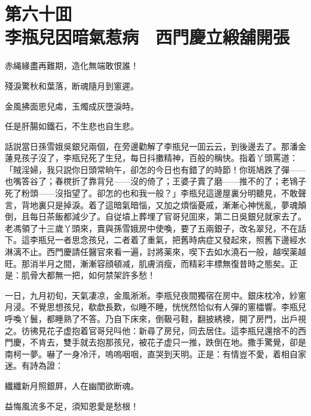 
\chapter*{第六十囬　\\李瓶兒因暗氣惹病　西門慶立緞舖開張}


\begin{myquote}
赤䋲緣盡再難期，造化無端敢恨誰！

殘淚驚秋和葉落，断魂隨月到窻遲。

金風拂面思兒䖏，玉燭成灰墮淚時。

任是肝腸如鐵石，不生悲也自生悲。
\end{myquote}

話説當日孫雪娥吳銀兒兩個，在旁邊勸解了李瓶兒一囬云云，到後邊去了。那潘金蓮見孩子沒了，李瓶兒死了生兒，每日抖擻精神，百般的稱快。指着丫頭罵道：「賊淫婦，我只説你日頭常晌午，卻怎的今日也有錯了的時節！你斑鳩跌了彈——也嘴答谷了；春櫈折了靠背兒——沒的倚了；王婆子賣了磨——推不的了；老鴇子死了粉頭——沒指望了。卻怎的也和我一般？」李瓶兒這邊屋裏分明聽見，不敢聲言，背地裏只是掉淚。着了這暗氣暗惱，又加之煩惱憂戚，漸漸心神恍亂，夢魂顛倒，且每日茶飯都減少了。自従墳上葬埋了官哥兒囬來，第二日吳銀兒就家去了。老馮領了十三歲丫頭來，賣與孫雪娥房中使喚，要了五兩銀子，改名翠兒，不在話下。這李瓶兒一者思念孩兒，二者着了重氣，把舊時病症又發起來，照舊下邊經水淋漓不止。西門慶請任醫官來看一遍，討將薬來，喫下去如水澆石一般，越喫薬越旺。那消半月之間，漸漸容顔頓减，肌膚消瘦，而精彩丰標無復昔時之態矣。正是：肌骨大都無一把，如何禁架許多愁！

一日，九月初旬，天氣凄凉，金風淅淅。李瓶兒夜間獨宿在房中。銀床枕冷，紗窻月浸。不覺思想孩兒，欷歔長歎，似睡不睡，恍恍然恰似有人彈的窻櫺響。李瓶兒呼喚丫鬟，都睡熟了不答。乃自下床來，倒靸弓鞋，翻披綉襖，開了房門，出戶視之。彷彿見花子虚抱着官哥兒呌他：新尋了房兒，同去居住。這李瓶兒還捨不的西門慶，不肯去，雙手就去抱那孩兒，被花子虚只一推，跌倒在地。撒手驚覺，卻是南柯一夢。嚇了一身冷汗，嗚嗚咽咽，直哭到天明。正是：有情豈不愛，着相自家迷。有詩為證：

\begin{myquote}
纖纖新月照銀屛，人在幽閨欲断魂。

益悔風流多不足，須知恩愛是愁根！
\end{myquote}

